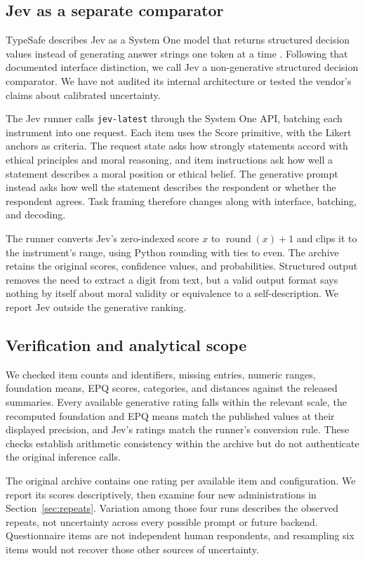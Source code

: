 \documentclass[11pt]{article}
\begin{document}
\subsection{Jev as a separate comparator}
TypeSafe describes Jev as a System One model that returns structured decision values instead of generating answer strings one token at a time \cite{typesafe}. Following that documented interface distinction, we call Jev a non-generative structured decision comparator. We have not audited its internal architecture or tested the vendor's claims about calibrated uncertainty.

The Jev runner calls \texttt{jev-latest} through the System One API, batching each instrument into one request. Each item uses the Score primitive, with the Likert anchors as criteria. The request state asks how strongly statements accord with ethical principles and moral reasoning, and item instructions ask how well a statement describes a moral position or ethical belief. The generative prompt instead asks how well the statement describes the respondent or whether the respondent agrees. Task framing therefore changes along with interface, batching, and decoding.

The runner converts Jev's zero-indexed score $x$ to $\operatorname{round}(x)+1$ and clips it to the instrument's range, using Python rounding with ties to even. The archive retains the original scores, confidence values, and probabilities. Structured output removes the need to extract a digit from text, but a valid output format says nothing by itself about moral validity or equivalence to a self-description. We report Jev outside the generative ranking.

\subsection{Verification and analytical scope}
We checked item counts and identifiers, missing entries, numeric ranges, foundation means, EPQ scores, categories, and distances against the released summaries. Every available generative rating falls within the relevant scale, the recomputed foundation and EPQ means match the published values at their displayed precision, and Jev's ratings match the runner's conversion rule. These checks establish arithmetic consistency within the archive but do not authenticate the original inference calls.

The original archive contains one rating per available item and configuration. We report its scores descriptively, then examine four new administrations in Section~\ref{sec:repeats}. Variation among those four runs describes the observed repeats, not uncertainty across every possible prompt or future backend. Questionnaire items are not independent human respondents, and resampling six items would not recover those other sources of uncertainty.
\end{document}
